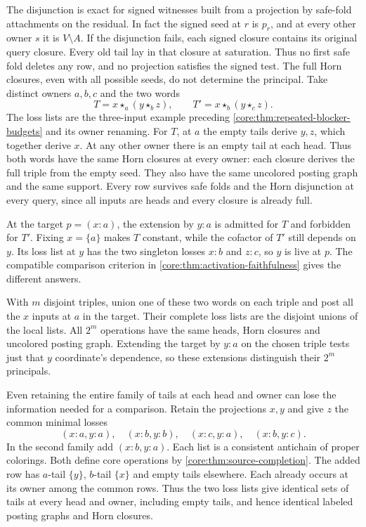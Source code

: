 The disjunction is exact for signed witnesses built
from a projection by safe-fold attachments on the
residual. In fact the signed seed at $r$ is $p_r$,
and at every other owner $s$ it is $V\setminus A$.
If the disjunction fails, each signed closure contains
its original query closure. Every old tail lay in
that closure at saturation. Thus no first safe fold
deletes any row, and no projection satisfies the signed
test. The full Horn closures, even with all possible seeds,
do not determine the principal. Take distinct owners
$a,b,c$ and the two words
\[
 T=x\star_a(y\star_b z),\qquad
 T'=x\star_b(y\star_c z).
\]
The loss lists are the three-input example preceding
\cref{core:thm:repeated-blocker-budgets} and its owner
renaming. For $T$, at $a$ the empty tails derive $y,z$,
which together derive $x$. At any other owner there is
an empty tail at each head. Thus both words have the
same Horn closures at every owner: each closure
derives the full triple from the empty seed.
They also have the same uncolored posting graph and
the same support. Every row survives safe folds and
the Horn disjunction at every query, since all
inputs are heads and every closure is already full.

At the target $p=(x{:}a)$, the extension by $y{:}a$
is admitted for $T$ and forbidden for $T'$.
Fixing $x=\{a\}$ makes $T$ constant, while the
cofactor of $T'$ still depends on $y$. Its loss list
at $y$ has the two singleton losses $x{:}b$ and
$z{:}c$, so $y$ is live at $p$. The compatible
comparison criterion in \cref{core:thm:activation-faithfulness}
gives the different answers.

With $m$ disjoint triples, union one of these two
words on each triple and post all the $x$ inputs
at $a$ in the target. Their complete loss lists are
the disjoint unions of the local lists. All $2^m$
operations have the same heads, Horn closures and
uncolored posting graph. Extending the target by
$y{:}a$ on the chosen triple tests just that $y$
coordinate's dependence, so these extensions
distinguish their $2^m$ principals.

Even retaining the entire family of tails at each
head and owner can lose the information needed for
a comparison. Retain the projections $x,y$ and
give $z$ the common minimal losses
\[
 (x{:}a,y{:}a),\quad (x{:}b,y{:}b),\quad
 (x{:}c,y{:}a),\quad (x{:}b,y{:}c).
\]
In the second family add $(x{:}b,y{:}a)$. Each list
is a consistent antichain of proper colorings.
Both define core operations by
\cref{core:thm:source-completion}. The added row has
$a$-tail $\{y\}$, $b$-tail $\{x\}$ and empty tails
elsewhere. Each already occurs at its owner among
the common rows. Thus the two loss lists give
identical sets of tails at every head and owner,
including empty tails, and hence identical labeled
posting graphs and Horn closures.

